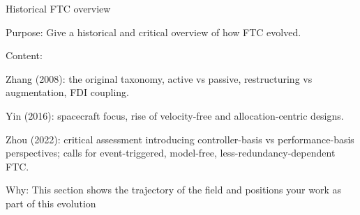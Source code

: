 Historical FTC overview

Purpose: Give a historical and critical overview of how FTC evolved.

Content:

Zhang (2008): the original taxonomy, active vs passive, restructuring vs augmentation, FDI coupling.

Yin (2016): spacecraft focus, rise of velocity-free and allocation-centric designs.

Zhou (2022): critical assessment introducing controller-basis vs performance-basis perspectives; calls for event-triggered, model-free, less-redundancy-dependent FTC.

Why: This section shows the trajectory of the field and positions your work as part of this evolution


